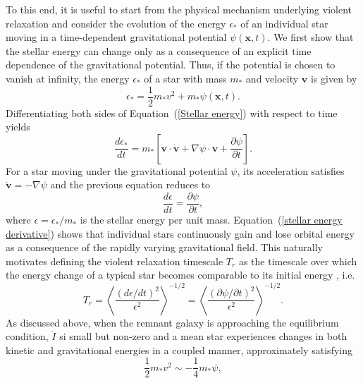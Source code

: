\documentclass[12pt,twoside,openany]{book}
\begin{document}
To this end, it is useful to start from the physical mechanism underlying violent relaxation and consider the evolution of the energy $\epsilon_*$ of an individual star moving in a time-dependent gravitational potential $\psi(\mathbf{x},t)$. We first show that the stellar energy can change only as a consequence of an explicit time dependence of the gravitational potential. Thus, if the potential is chosen to vanish at infinity, the energy $\epsilon_*$ of a star with mass $m_*$ and velocity $\mathbf{v}$ is given by
\begin{equation}\label{Stellar energy}
 \epsilon_*=\frac{1}{2}m_*v^2+m_*\psi(\mathbf{x},t).
\end{equation}
Differentiating both sides of Equation~(\ref{Stellar energy}) with respect to time yields
\begin{equation}
 \frac{d\epsilon_*}{dt}=m_*\left[\mathbf{v}\cdot \dot{\mathbf{v}}+\nabla\psi \cdot \mathbf{v} +\frac{\partial\psi}{\partial t}\right].
\end{equation}
For a star moving under the gravitational potential $\psi$, its acceleration satisfies $\dot{\mathbf{v}}=-\nabla\psi$ and the previous equation reduces to
\begin{equation}\label{stellar energy derivative}
\frac{d\epsilon}{dt}=\frac{\partial\psi}{\partial t},
\end{equation}
where $\epsilon=\epsilon_*/m_*$ is the stellar energy per unit mass. Equation~(\ref{stellar energy derivative}) shows that individual stars continuously gain and lose orbital energy as a consequence of the rapidly varying gravitational field. This naturally motivates defining the violent relaxation timescale $T_r$ as the timescale over which the energy change of a typical star becomes comparable to its initial energy \parencite{Lynden_1967}, i.e.
\begin{equation}
T_r =
\left\langle
\frac{\left( d\epsilon / dt \right)^2}{\epsilon^2}
\right\rangle^{-1/2}
=
\left\langle
\frac{\left( \partial \psi / \partial t \right)^2}{\epsilon^2}
\right\rangle^{-1/2}.
\label{violent_relaxation_time}
\end{equation}
As discussed above, when the remnant galaxy is approaching the equilibrium condition,  $\ddot{I}$ si small but non-zero and a mean star experiences changes in both kinetic and gravitational energies in a coupled manner, approximately satisfying
\begin{equation}
\frac{1}{2}m_*v^2 \sim - \frac{1}{4}m_*\psi,
\label{mean_star_kinetic_potential_relation}
\end{equation}
\end{document}
